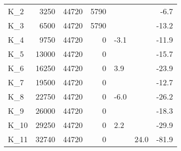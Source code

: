 \begin{tabular}{lrrrllr}
K\_2 & 3250 & 44720 & 5790 &  &  & -6.7 \\
K\_3 & 6500 & 44720 & 5790 &  &  & -13.2 \\
K\_4 & 9750 & 44720 & 0 & -3.1 &  & -11.9 \\
K\_5 & 13000 & 44720 & 0 &  &  & -15.7 \\
K\_6 & 16250 & 44720 & 0 & 3.9 &  & -23.9 \\
K\_7 & 19500 & 44720 & 0 &  &  & -12.7 \\
K\_8 & 22750 & 44720 & 0 & -6.0 &  & -26.2 \\
K\_9 & 26000 & 44720 & 0 &  &  & -18.3 \\
K\_10 & 29250 & 44720 & 0 & 2.2 &  & -29.9 \\
K\_11 & 32740 & 44720 & 0 &  & 24.0 & -81.9 \\
\bottomrule
\end{tabular}
